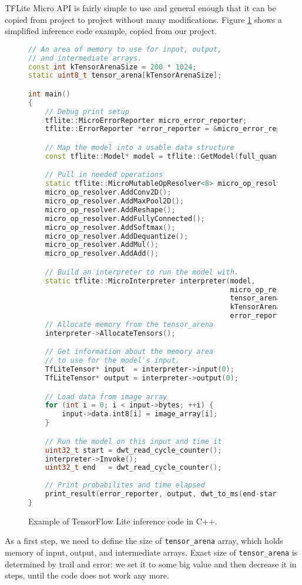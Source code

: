 TFLite Micro API is fairly simple to use and general enough that it can be copied from project to project without many modifications.
Figure \ref{inference_code} shows a simplified inference code example, copied from our project.
\lstset{style=mystyle}
\begin{figure}[ht] 
    \begin{lstlisting}[language=C++]
// An area of memory to use for input, output, 
// and intermediate arrays.
const int kTensorArenaSize = 200 * 1024;
static uint8_t tensor_arena[kTensorArenaSize];

int main() 
{
    // Debug print setup
    tflite::MicroErrorReporter micro_error_reporter;
    tflite::ErrorReporter *error_reporter = &micro_error_reporter;

    // Map the model into a usable data structure
    const tflite::Model* model = tflite::GetModel(full_quant_tflite);

    // Pull in needed operations
    static tflite::MicroMutableOpResolver<8> micro_op_resolver;
    micro_op_resolver.AddConv2D();
    micro_op_resolver.AddMaxPool2D();
    micro_op_resolver.AddReshape();
    micro_op_resolver.AddFullyConnected();
    micro_op_resolver.AddSoftmax();
    micro_op_resolver.AddDequantize();
    micro_op_resolver.AddMul();
    micro_op_resolver.AddAdd();

    // Build an interpreter to run the model with.
    static tflite::MicroInterpreter interpreter(model, 
                                                micro_op_resolver, 
                                                tensor_arena,
                                                kTensorArenaSize, 
                                                error_reporter);
    // Allocate memory from the tensor_arena
    interpreter->AllocateTensors();

    // Get information about the memory area 
    // to use for the model's input.
    TfLiteTensor* input  = interpreter->input(0);
    TfLiteTensor* output = interpreter->output(0);

    // Load data from image array
    for (int i = 0; i < input->bytes; ++i) {
        input->data.int8[i] = image_array[i];
    }

    // Run the model on this input and time it
    uint32_t start = dwt_read_cycle_counter();
    interpreter->Invoke();
    uint32_t end   = dwt_read_cycle_counter();
    
    // Print probabilites and time elapsed
    print_result(error_reporter, output, dwt_to_ms(end-start));
}
    \end{lstlisting}
    \caption{ Example of TensorFlow Lite inference code in C++.}
    \label{inference_code}
\end{figure}
\clearpage
As a first step, we need to define the size of \verb|tensor_arena| array, which holds memory of input, output, and intermediate arrays.
Exact size of \verb|tensor_arena| is determined by trail and error: we set it to some big value and then decrease it in steps, until the code does not work any more.

